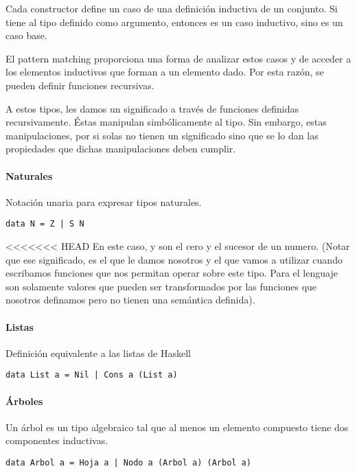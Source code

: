 Cada constructor define un caso de una definición inductiva de un conjunto. Si tiene al tipo definido como argumento, entonces es un caso inductivo, sino es un caso base.

El pattern matching proporciona una forma de analizar estos casos y de acceder a los elementos inductivos que forman a un elemento dado. Por esta razón, se pueden definir funciones recursivas.

A estos tipos, les damos un significado a través de funciones definidas recursivamente. Éstas manipulan simbólicamente al tipo. Sin embargo, estas manipulaciones, por si solas no tienen un significado sino que se lo dan las propiedades que dichas manipulaciones deben cumplir.

\paragraph{Naturales} Notación unaria para expresar tipos naturales.
\begin{centrado}
	\begin{verbatim}
data N = Z | S N
	\end{verbatim}
\end{centrado}
<<<<<<< HEAD
En este caso,  y  son el cero y el sucesor de un numero. (Notar que ese significado, es el que le damos nosotros y el que vamos a utilizar cuando escribamos funciones que nos permitan operar sobre este tipo. Para el lenguaje son solamente valores que pueden ser transformados por las funciones que nosotros definamos pero no tienen una semántica definida).

\paragraph{Listas} Definición equivalente a las listas de Haskell
\begin{centrado}
	\begin{verbatim}
data List a = Nil | Cons a (List a)
	\end{verbatim}
\end{centrado}

\paragraph{Árboles}
Un árbol es un tipo algebraico tal que al menos un elemento compuesto tiene dos componentes inductivas.

\begin{centrado}
	\begin{verbatim}
data Arbol a = Hoja a | Nodo a (Arbol a) (Arbol a)
	\end{verbatim}
\end{centrado}

